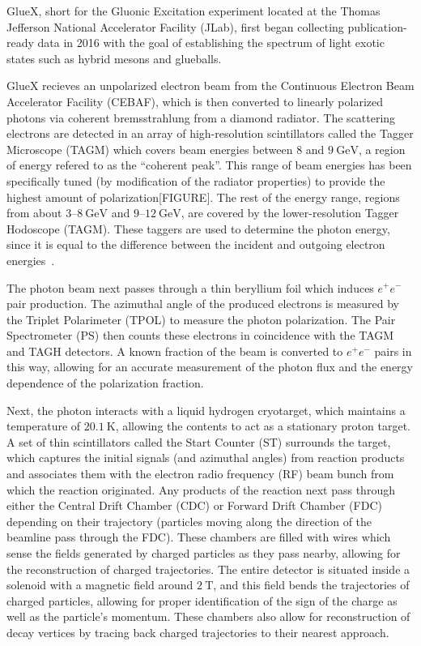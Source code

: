 GlueX, short for the Gluonic Excitation experiment located at the Thomas Jefferson National Accelerator Facility (JLab), first began collecting publication-ready data in 2016 with the goal of establishing the spectrum of light exotic states such as hybrid mesons and glueballs.

GlueX recieves an unpolarized electron beam from the Continuous Electron Beam Accelerator Facility (CEBAF), which is then converted to linearly polarized photons via coherent bremsstrahlung from a diamond radiator. The scattering electrons are detected in an array of high-resolution scintillators called the Tagger Microscope (TAGM) which covers beam energies between $8$ and $\SI{9}{\giga\eV}$, a region of energy refered to as the ``coherent peak''. This range of beam energies has been specifically tuned (by modification of the radiator properties) to provide the highest amount of polarization{\color{red}[FIGURE]}. The rest of the energy range, regions from about $3$--$\SI{8}{\giga\eV}$ and $9$--$\SI{12}{\giga\eV}$, are covered by the lower-resolution Tagger Hodoscope (TAGM). These taggers are used to determine the photon energy, since it is equal to the difference between the incident and outgoing electron energies~\cite{adhikari_gluex_2021}.

The photon beam next passes through a thin beryllium foil which induces $e^+e^-$ pair production. The azimuthal angle of the produced electrons is measured by the Triplet Polarimeter (TPOL) to measure the photon polarization. The Pair Spectrometer (PS) then counts these electrons in coincidence with the TAGM and TAGH detectors. A known fraction of the beam is converted to $e^+e^-$ pairs in this way, allowing for an accurate measurement of the photon flux and the energy dependence of the polarization fraction.

Next, the photon interacts with a liquid hydrogen cryotarget, which maintains a temperature of $\SI{20.1}{\K}$, allowing the contents to act as a stationary proton target. A set of thin scintillators called the Start Counter (ST) surrounds the target, which captures the initial signals (and azimuthal angles) from reaction products and associates them with the electron radio frequency (RF) beam bunch from which the reaction originated. Any products of the reaction next pass through either the Central Drift Chamber (CDC) or Forward Drift Chamber (FDC) depending on their trajectory (particles moving along the direction of the beamline pass through the FDC). These chambers are filled with wires which sense the fields generated by charged particles as they pass nearby, allowing for the reconstruction of charged trajectories. The entire detector is situated inside a solenoid with a magnetic field around $\SI{2}{\tesla}$, and this field bends the trajectories of charged particles, allowing for proper identification of the sign of the charge as well as the particle's momentum. These chambers also allow for reconstruction of decay vertices by tracing back charged trajectories to their nearest approach.

